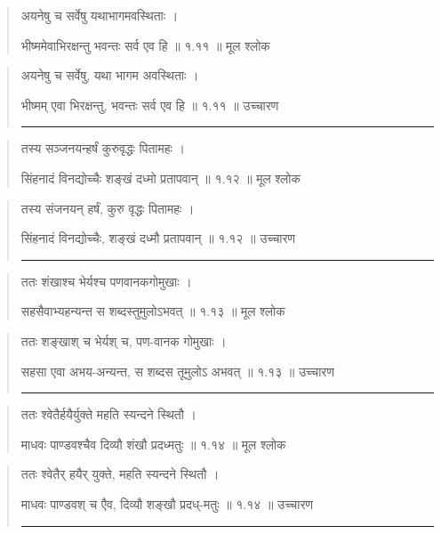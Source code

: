 \begin{quotation} 
अयनेषु च सर्वेषु यथाभागमवस्थिताः  ।  

भीष्ममेवाभिरक्षन्तु भवन्तः सर्व एव हि  ॥ १.११ ॥  मूल श्लोक
\end{quotation}

\begin{quotation}

अयनेषु च सर्वेषु, यथा भागम अवस्थिताः  ।  

भीष्मम् एवा भिरक्षन्तु, भवन्तः सर्व एव हि  ॥ १.११ ॥  उच्चारण

\noindent\rule{16cm}{0.4pt} 
\end{quotation}


\begin{quotation} 

तस्य सञ्जनयन्हर्षं कुरुवृद्धः पितामहः  ।  

सिंहनादं विनद्योच्चैः शङ्खं दध्मो प्रतापवान्‌   ॥ १.१२ ॥  मूल श्लोक
\end{quotation}

\begin{quotation}

तस्य संजनयन् हर्षं, कुरु वृद्धः पितामहः  ।  

सिंहनादं विनद्योच्चैः, शङ्खं दध्मौ प्रतापवान्  ॥ १.१२ ॥  उच्चारण

\noindent\rule{16cm}{0.4pt} 
\end{quotation}


\begin{quotation} 

ततः शंखाश्च भेर्यश्च पणवानकगोमुखाः  ।  

सहसैवाभ्यहन्यन्त स शब्दस्तुमुलोऽभवत्‌  ॥ १.१३ ॥  मूल श्लोक
\end{quotation}

\begin{quotation}

ततः शङ्खाश् च भेर्यश् च, पण-वानक गोमुखाः  ।  

सहसा एवा अभय-अन्यन्त, स शब्दस तूमुलोऽ अभवत्  ॥ १.१३ ॥  उच्चारण

\noindent\rule{16cm}{0.4pt} 
\end{quotation}


\begin{quotation} 

ततः श्वेतैर्हयैर्युक्ते महति स्यन्दने स्थितौ  ।  

माधवः पाण्डवश्चैव दिव्यौ शंखौ प्रदध्मतुः   ॥ १.१४ ॥  मूल श्लोक
\end{quotation}

\begin{quotation}

ततः श्वेतैर् हयैर् युक्ते, महति स्यन्दने स्थितौ  ।  

माधवः पाण्डवश् च एैव, दिव्यौ शङ्खौ प्रदध्-मतुः  ॥ १.१४ ॥  उच्चारण

\noindent\rule{16cm}{0.4pt} 
\end{quotation}


